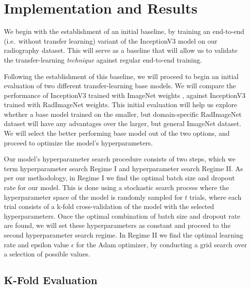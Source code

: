 \chapter{Implementation and Results}\label{implementation}

We begin with the establishment of an initial baseline, by training an end-to-end (i.e.\ without transfer learning) variant of the InceptionV3 model on our radiography dataset. This will serve as a baseline that will allow us to validate the transfer-learning \emph{technique} against regular end-to-end training.

Following the establishment of this baseline, we will proceed to begin an initial evaluation of two different transfer-learning base models. We will compare the performance of InceptionV3 trained with ImageNet weights \autocite{imagenet}, against InceptionV3 trained with RadImageNet \autocite{radimagenet} weights. This initial evaluation will help us explore whether a base model trained on the smaller, but domain-specific RadImageNet dataset will have any advantages over the larger, but general ImageNet dataset. We will select the better performing base model out of the two options, and proceed to optimize the model's hyperparameters.

Our model's hyperparameter search procedure consists of two steps, which we term hyperparameter search Regime I and hyperparameter search Regime II. As per our methodology, in Regime I we find the optimal batch size and dropout rate for our model. This is done using a stochastic search process where the hyperparameter space of the model is randomly sampled for \(t\) trials, where each trial consists of a k-fold cross-validation of the model with the selected hyperparameters. Once the optimal combination of batch size and dropout rate are found, we will set these hyperparameters as constant and proceed to the second hyperparameter search regime. In Regime II we find the optimal learning rate and epsilon value \(\epsilon\) for the Adam optimizer, by conducting a grid search over a selection of possible values.

\section{K-Fold Evaluation}

